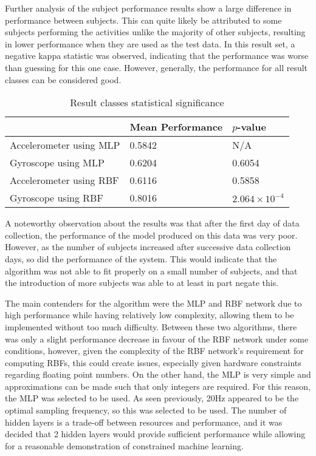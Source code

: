 Further analysis of the subject performance results show a large difference in performance between subjects. This can quite likely be attributed to some subjects performing the activities unlike the majority of other subjects, resulting in lower performance when they are used as the test data. In this result set, a negative kappa statistic was observed, indicating that the performance was worse than guessing for this one case. However, generally, the performance for all result classes can be considered good.

\begin{table}
	\centering
	\begin{tabular}{l|ll}
		& Mean Performance & $p$-value \\
		\hline
		Accelerometer using MLP & 0.5842 & N/A \\
		Gyroscope using MLP     & 0.6204 & 0.6054 \\
		Accelerometer using RBF & 0.6116 & 0.5858 \\
		Gyroscope using RBF     & 0.8016 & $2.064 \times 10^{-4}$ \\        
	\end{tabular}
	\caption{Result classes statistical significance \label{tab:res-ttest}}
\end{table}

A noteworthy observation about the results was that after the first day of data collection, the performance of the model produced on this data was very poor. However, as the number of subjects increased after successive data collection days, so did the performance of the system. This would indicate that the algorithm was not able to fit properly on a small number of subjects, and that the introduction of more subjects was able to at least in part negate this.

The main contenders for the algorithm were the MLP and RBF network due to high performance while having relatively low complexity, allowing them to be implemented without too much difficulty. Between these two algorithms, there was only a slight performance decrease in favour of the RBF network under some conditions, however, given the complexity of the RBF network's requirement for computing RBFs, this could create issues, especially given hardware constraints regarding floating point numbers. On the other hand, the MLP is very simple and approximations can be made such that only integers are required. For this reason, the MLP was selected to be used. As seen previously, 20Hz appeared to be the optimal sampling frequency, so this was selected to be used. The number of hidden layers is a trade-off between resources and performance, and it was decided that 2 hidden layers would provide sufficient performance while allowing for a reasonable demonstration of constrained machine learning.